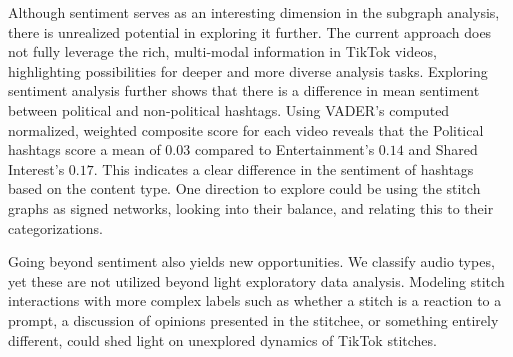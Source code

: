 Although sentiment serves as an interesting dimension in the subgraph analysis, there is unrealized potential in exploring it further. The current approach does not fully leverage the rich, multi-modal information in TikTok videos, highlighting possibilities for deeper and more diverse analysis tasks. Exploring sentiment analysis further shows that there is a difference in mean sentiment between political and non-political hashtags. Using VADER's computed normalized, weighted composite score for each video reveals that the Political hashtags score a mean of $0.03$ compared to Entertainment's $0.14$ and Shared Interest's $0.17$. This indicates a clear difference in the sentiment of hashtags based on the content type. One direction to explore could be using the stitch graphs as signed networks, looking into their balance, and relating this to their categorizations. 

Going beyond sentiment also yields new opportunities. We classify audio types, yet these are not utilized beyond light exploratory data analysis. Modeling stitch interactions with more complex labels such as whether a stitch is a reaction to a prompt, a discussion of opinions presented in the stitchee, or something entirely different, could shed light on unexplored dynamics of TikTok stitches.  





 

